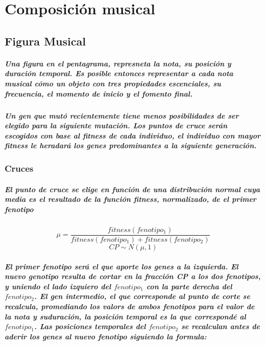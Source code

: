 \chapter{Composición musical}
    \section{Figura Musical}

        \paragraph{Una figura en el pentagrama, represneta la nota, su posición y duración temporal. Es posible entonces representar a cada nota musical cómo un objeto con tres propiedades escenciales, su frecuencia, el momento de inicio y el fomento final.}

        \paragraph{Un gen que mutó recientemente tiene menos posibilidades de ser elegido para la siguiente mutación. Los puntos de cruce serán escogidos con base al fitness de cada individuo, el individuo con mayor fitness le heradará los genes predominantes a la siguiente generación.}

        \subsection{Cruces}
          \paragraph{El punto de cruce se elige en función de una distribución normal cuya media es el resultado de la función fitness, normalizado, de el primer fenotipo}

          \begin{equation}
              \mu = \frac{fitness(fenotipo_1)}{fitness(fenotipo_1) + fitness(fenotipo_2)}
          \end{equation}
          \begin{equation}
              CP \sim N(\mu,1)
          \end{equation}

          \paragraph{El primer fenotipo será el que aporte los genes a la izquierda. El nuevo genotipo resulta de cortar en la fracción CP a los dos fenotipos, y uniendo el lado izquiero del $fenotipo_{1}$ con la parte derecha del $fenotipo_{2}$. El gen intermedio, el que corresponde al punto de corte se recalcula, promediando los valors de ambos fenotipos para el valor de la nota y suduración, la posición temporal es la que correspondé al $fenotipo_{1}$. Las posiciones temporales del $fenotipo_{2}$ se recalculan antes de aderir los genes al nuevo fenotipo siguiendo la formula:}

